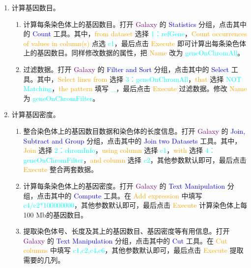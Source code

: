 \begin{description}
\begin{enumerate}
\begin{enumerate}
\begin{enumerate}
						\end{enumerate}
				\end{enumerate}
			\item 计算基因数目。
				\begin{enumerate}
					\item
					  计算每条染色体上的基因数目。打开 \textcolor{purple}{Galaxy} 的 \textcolor{blue}{Statistics} 分组，点击其中的 \textcolor{blue}{Count} 工具。其中，\textcolor{orange}{from dataset} 选择 \textcolor{cyan}{1：refGene}，\textcolor{orange}{Count occurrences of values in column(s)} 点选  \textcolor{cyan}{c1}，最后点击 \textcolor{orange}{Execute} 即可计算出每条染色体上的基因数目。同样修改数据的属性，把 \textcolor{orange}{Name} 改为 \textcolor{cyan}{geneOnChromAll}。
					\item 过滤数据。打开 \textcolor{purple}{Galaxy} 的 \textcolor{blue}{Filter and Sort} 分组，点击其中的 \textcolor{blue}{Select} 工具。其中，\textcolor{orange}{Select lines from} 选择 \textcolor{cyan}{3：geneOnChromAll}，\textcolor{orange}{that} 选择 \textcolor{cyan}{NOT Matching}，\textcolor{orange}{the pattern} 填写 \textcolor{cyan}{\_}，最后点击 \textcolor{orange}{Execute} 过滤数据。修改 \textcolor{orange}{Name} 为 \textcolor{cyan}{geneOnChromFilter}。
				\end{enumerate}
			\item 计算基因密度。
				\begin{enumerate}
					\item 整合染色体上的基因数目数据和染色体的长度信息。打开 \textcolor{purple}{Galaxy} 的 \textcolor{blue}{Join, Subtract and Group} 分组，点击其中的 \textcolor{blue}{Join two Datasets} 工具。其中，\textcolor{orange}{Join} 选择 \textcolor{cyan}{2：chromInfo}，\textcolor{orange}{using column} 选择 \textcolor{cyan}{c1}，\textcolor{orange}{with} 选择 \textcolor{cyan}{4： geneOnChromFilter}，\textcolor{orange}{and column} 选择 \textcolor{cyan}{c2}，其他参数默认即可，最后点击 \textcolor{orange}{Execute} 整合两套数据。
					\item 计算每条染色体上的基因密度。打开 \textcolor{purple}{Galaxy} 的 \textcolor{blue}{Text Manipulation} 分组，点击其中的 \textcolor{blue}{Compute} 工具。在 \textcolor{orange}{Add expression} 中填写 \textcolor{cyan}{c4/c2*100000000}，其他参数默认即可，最后点击 \textcolor{orange}{Execute} 计算染色体上每100 Mb的基因数目。
					\item 提取染色体号、长度及其上的基因数目、基因密度等有用信息。打开 \textcolor{purple}{Galaxy} 的 \textcolor{blue}{Text Manipulation} 分组，点击其中的 \textcolor{blue}{Cut} 工具。在 \textcolor{orange}{Cut columns} 中填写 \textcolor{cyan}{c1,c2,c4,c6}，其他参数默认即可，最后点击 \textcolor{orange}{Execute} 提取需要的几列。

\end{enumerate}
\end{enumerate}
\end{description}

